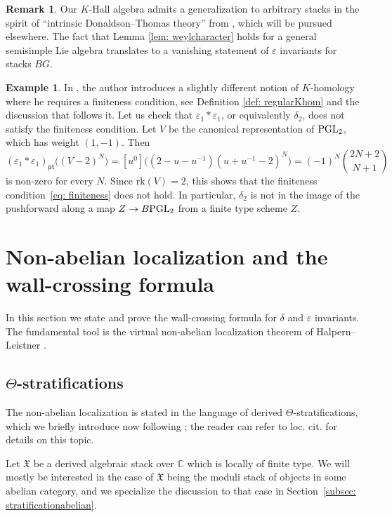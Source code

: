 \documentclass[12pt]{amsart}
\theoremstyle{definition}
\newtheorem{example}[definition]{Example}
\newtheorem{remark}[definition]{Remark}
\newcommand{\1}{\mathbf 1}
\newcommand{\PGL}{{\rm PGL}}
\newcommand{\pt}{{\mathsf{pt}}}
\newcommand{\rk}{\mathrm{rk}}
\begin{document}
\begin{remark}
   Our $K$-Hall algebra admits a generalization to arbitrary stacks in the spirit of ``intrinsic Donaldson--Thomas theory'' from \cite{intrinsicDT1, intrinsicDT2}, which will be pursued elsewhere.  The fact that Lemma \ref{lem: weylcharacter} holds for a general semisimple Lie algebra translates to a vanishing statement of $\varepsilon$ invariants for stacks $BG$. 
\end{remark}


\begin{example}\label{ex: deltanotregular}
   In \cite{Liu}, the author introduces a slightly different notion of $K$-homology where he requires a finiteness condition, see Definition \ref{def: regularKhom} and the discussion that follows it. Let us check that $\varepsilon_1\ast \varepsilon_1$, or equivalently $\delta_2$, does not satisfy the finiteness condition. Let $V$ be the canonical representation of $\PGL_2$, which has weight $(1, -1)$. Then
\[(\varepsilon_1\ast\varepsilon_1)_\pt\big((V-2)^N\big)=[u^0]\big((2-u-u^{-1})(u+u^{-1}-2)^N\big)=(-1)^N\binom{2N+2}{N+1}\]
   is non-zero for every $N$. Since $\rk(V)=2$, this shows that the finiteness condition~\eqref{eq: finiteness} does not hold. In particular, $\delta_2$ is not in the image of the pushforward along a map $Z\to B\PGL_2$ from a finite type scheme $Z$.
\end{example}


\section{Non-abelian localization and the wall-crossing formula}
\label{sec: NAL}

In this section we state and prove the wall-crossing formula for $\delta$ and $\varepsilon$ invariants. The fundamental tool is the virtual non-abelian localization theorem of Halpern--Leistner \cite{HLremarks, HLNAL}. 

\subsection{$\Theta$-stratifications}
\label{subsec: Theta}
The non-abelian localization is stated in the language of derived $\Theta$-stratifications, which we briefly introduce now following \cite[Section~1]{HLderived}; the reader can refer to loc. cit. for details on this topic.

Let $\mathfrak X$ be a derived algebraic stack over $\mathbb C$ which is locally of finite type. We will mostly be interested in the case of $\mathfrak X$ being the moduli stack of objects in some abelian category, and we specialize the discussion to that case in Section~\ref{subsec: stratificationabelian}.
\end{document}
